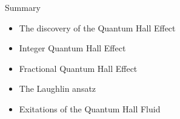 \documentclass{beamer}
\begin{document}
\begin{frame}{Summary}
\begin{itemize}
\item The discovery of the Quantum Hall Effect
\vspace{10pt}
\item Integer Quantum Hall Effect
\vspace{10pt}
\item Fractional Quantum Hall Effect
\vspace{10pt}
\item The Laughlin ansatz
\vspace{10pt}
\item Exitations of the Quantum Hall Fluid
\end{itemize}
\end{frame}
\end{document}
